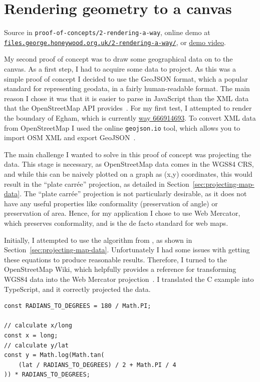 \documentclass{final_report}
\begin{document}
\section{Rendering geometry to a canvas}

{ \footnotesize Source in \texttt{proof-of-concepts/2-rendering-a-way}, online demo at \href{https://files.george.honeywood.org.uk/2-rendering-a-way/}{\nolinkurl{files.george.honeywood.org.uk/2-rendering-a-way/}}, or \href{https://youtu.be/2F_vpCrQsO4}{demo video}.}

My second proof of concept was to draw some geographical data on to the canvas. As a first step, I had to acquire some data to project. As this was a simple proof of concept I decided to use the GeoJSON format, which a popular standard for representing geodata, in a fairly human-readable format. The main reason I chose it was that it is easier to parse in JavaScript than the XML data that the OpenStreetMap API provides~\cite{osm-api-wiki}. For my first test, I attempted to render the boundary of Egham, which is currently \href{https://www.openstreetmap.org/way/666914693}{way 666914693}. To convert XML data from OpenStreetMap I used the online \texttt{geojson.io} tool, which allows you to import OSM XML and export GeoJSON~\cite{geojson.io}.

The main challenge I wanted to solve in this proof of concept was projecting the data. This stage is necessary, as OpenStreetMap data comes in the WGS84 CRS, and while this can be naively plotted on a graph as (x,y) coordinates, this would result in the ``plate carrée'' projection, as detailed in Section~\ref{sec:projecting-map-data}. The ``plate carrée'' projection is not particularly desirable, as it does not have any useful properties like conformality (preservation of angle) or preservation of area. Hence, for my application I chose to use Web Mercator, which preserves conformality, and is the de facto standard for web maps.

Initially, I attempted to use the algorithm from \textcite[41]{snyder1987map}, as shown in Section~\ref{sec:projecting-map-data}. Unfortunately I had some issues with getting these equations to produce reasonable results. Therefore, I turned to the OpenStreetMap Wiki, which helpfully provides a reference for transforming WGS84 data into the Web Mercator projection~\cite{osm-wiki-mercator}. I translated the C example into TypeScript, and it correctly projected the data.

\begin{lstlisting}[caption=Projecting to Web Mercator]
const RADIANS_TO_DEGREES = 180 / Math.PI;

// calculate x/long
const x = long;
// calculate y/lat
const y = Math.log(Math.tan(
    (lat / RADIANS_TO_DEGREES) / 2 + Math.PI / 4
)) * RADIANS_TO_DEGREES;
\end{lstlisting}
\end{document}
